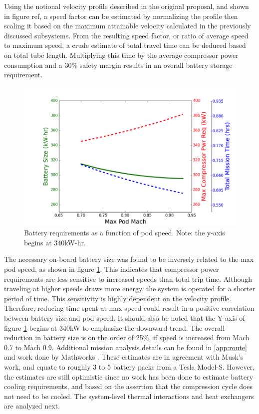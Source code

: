 \documentclass[heading.tex]{subfiles}
\begin{document}
Using the notional velocity profile described in the original proposal, and shown in figure {ref},
a speed factor can be estimated by normalizing the profile then scaling it based on the maximum
attainable velocity calculated in the previously discussed subsystems.
From the resulting speed factor, or ratio of average speed to maximum speed,
a crude estimate of total travel time can be deduced based on total tube length.
Multiplying this time by the average compressor power consumption and a 30\% safety margin results in an overall battery storage requirement.

\begin{figure}[hbtp]
\centering
\includegraphics[width=\textwidth]{images/battery_plot.png}
\caption[Battery requirements as a function of pod speed]{Battery requirements as a function of pod speed. Note: the y-axis begins at 340kW-hr.}
\label{f:battery}
\end{figure}

The necessary on-board battery size was found to be inversely related to the max pod speed, as shown in figure \ref{f:battery}.
This indicates that compressor power requirements are less sensitive to increased speeds than total trip time.
Although traveling at higher speeds draws more energy, the system is operated for a shorter period of time.
This sensitivity is highly dependent on the velocity profile.
Therefore, reducing time spent at max speed could result in a positive correlation between battery size and pod speed.
It should also be noted that the Y-axis of figure \ref{f:battery} begins at 340kW to emphasize the downward trend.
The overall reduction in battery size is on the order of 25\%, if speed is increased from Mach 0.7 to Mach 0.9.
Additional mission analysis details can be found in \cref{app:route} and work done by Mathworks \cite{Rouleau}.
These estimates are in agreement with Musk’s work, and equate to roughly 3 to 5 battery packs from a Tesla Model-S.
However, the estimates are still optimistic since no work has been done to estimate battery cooling requirements,
and based on the assertion that the compression cycle does not need to be cooled.
The system-level thermal interactions and heat exchangers are analyzed next.
\end{document}
